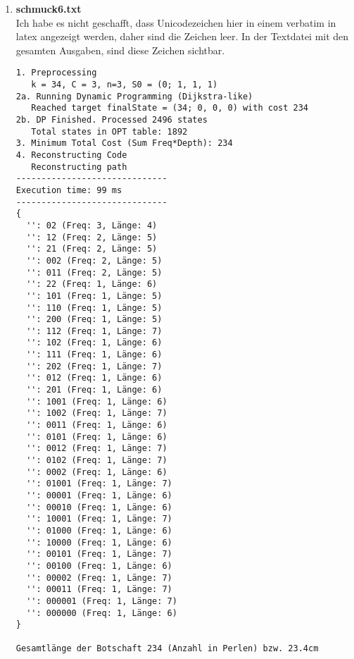 \documentclass[a4paper,10pt,ngerman]{scrartcl}
\begin{document}
\begin{enumerate}
  \item \textbf{schmuck6.txt}
  \\
  Ich habe es nicht geschafft, dass Unicodezeichen hier in einem verbatim in latex angezeigt werden, daher sind die Zeichen leer. In der Textdatei mit den gesamten Ausgaben, sind diese Zeichen sichtbar.
  \begin{verbatim}
1. Preprocessing
   k = 34, C = 3, n=3, S0 = (0; 1, 1, 1)
2a. Running Dynamic Programming (Dijkstra-like)
   Reached target finalState = (34; 0, 0, 0) with cost 234
2b. DP Finished. Processed 2496 states
   Total states in OPT table: 1892
3. Minimum Total Cost (Sum Freq*Depth): 234
4. Reconstructing Code
   Reconstructing path
------------------------------
Execution time: 99 ms
------------------------------
{
  '': 02 (Freq: 3, Länge: 4)
  '': 12 (Freq: 2, Länge: 5)
  '': 21 (Freq: 2, Länge: 5)
  '': 002 (Freq: 2, Länge: 5)
  '': 011 (Freq: 2, Länge: 5)
  '': 22 (Freq: 1, Länge: 6)
  '': 101 (Freq: 1, Länge: 5)
  '': 110 (Freq: 1, Länge: 5)
  '': 200 (Freq: 1, Länge: 5)
  '': 112 (Freq: 1, Länge: 7)
  '': 102 (Freq: 1, Länge: 6)
  '': 111 (Freq: 1, Länge: 6)
  '': 202 (Freq: 1, Länge: 7)
  '': 012 (Freq: 1, Länge: 6)
  '': 201 (Freq: 1, Länge: 6)
  '': 1001 (Freq: 1, Länge: 6)
  '': 1002 (Freq: 1, Länge: 7)
  '': 0011 (Freq: 1, Länge: 6)
  '': 0101 (Freq: 1, Länge: 6)
  '': 0012 (Freq: 1, Länge: 7)
  '': 0102 (Freq: 1, Länge: 7)
  '': 0002 (Freq: 1, Länge: 6)
  '': 01001 (Freq: 1, Länge: 7)
  '': 00001 (Freq: 1, Länge: 6)
  '': 00010 (Freq: 1, Länge: 6)
  '': 10001 (Freq: 1, Länge: 7)
  '': 01000 (Freq: 1, Länge: 6)
  '': 10000 (Freq: 1, Länge: 6)
  '': 00101 (Freq: 1, Länge: 7)
  '': 00100 (Freq: 1, Länge: 6)
  '': 00002 (Freq: 1, Länge: 7)
  '': 00011 (Freq: 1, Länge: 7)
  '': 000001 (Freq: 1, Länge: 7)
  '': 000000 (Freq: 1, Länge: 6)
}

Gesamtlänge der Botschaft 234 (Anzahl in Perlen) bzw. 23.4cm


\end{verbatim}
\end{enumerate}
\end{document}
